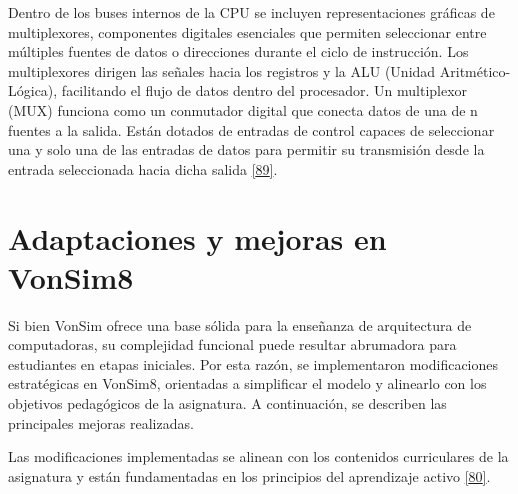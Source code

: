 \documentclass[12pt,oneside]{templates/unerthesis}
\begin{document}
Dentro de los buses internos de la CPU se incluyen representaciones gráficas de multiplexores, componentes digitales esenciales que permiten seleccionar entre múltiples fuentes de datos o direcciones durante el ciclo de instrucción. Los multiplexores dirigen las señales hacia los registros y la ALU (Unidad Aritmético-Lógica), facilitando el flujo de datos dentro del procesador. Un multiplexor (MUX) funciona como un conmutador digital que conecta datos de una de n fuentes a la salida. Están dotados de entradas de control capaces de seleccionar una y solo una de las entradas de datos para permitir su transmisión desde la entrada seleccionada hacia dicha salida \protect\hyperlink{ref-mano2017digital}{{[}89{]}}.

\hypertarget{mejoras-vonsim8}{%
\section{Adaptaciones y mejoras en VonSim8}\label{mejoras-vonsim8}}

Si bien VonSim ofrece una base sólida para la enseñanza de arquitectura de computadoras, su complejidad funcional puede resultar abrumadora para estudiantes en etapas iniciales. Por esta razón, se implementaron modificaciones estratégicas en VonSim8, orientadas a simplificar el modelo y alinearlo con los objetivos pedagógicos de la asignatura. A continuación, se describen las principales mejoras realizadas.

Las modificaciones implementadas se alinean con los contenidos curriculares de la asignatura y están fundamentadas en los principios del aprendizaje activo \protect\hyperlink{ref-bonwell1991active}{{[}80{]}}.
\end{document}
